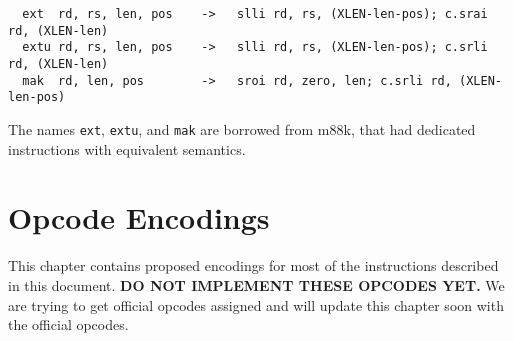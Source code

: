 \begin{minipage}{\linewidth}
\begin{verbatim}
  ext  rd, rs, len, pos    ->   slli rd, rs, (XLEN-len-pos); c.srai rd, (XLEN-len)
  extu rd, rs, len, pos    ->   slli rd, rs, (XLEN-len-pos); c.srli rd, (XLEN-len)
  mak  rd, len, pos        ->   sroi rd, zero, len; c.srli rd, (XLEN-len-pos)
\end{verbatim}
\end{minipage}

The names {\tt ext}, {\tt extu}, and {\tt mak} are borrowed from m88k, that had
dedicated instructions with equivalent semantics.~\cite[p.~3-28]{m88k}


\section{Opcode Encodings}
\label{opcodes}

This chapter contains proposed encodings for most of the instructions described
in this document. {\bf DO NOT IMPLEMENT THESE OPCODES YET.} We are trying to get
official opcodes assigned and will update this chapter soon with the official
opcodes.


%
%
%
%


